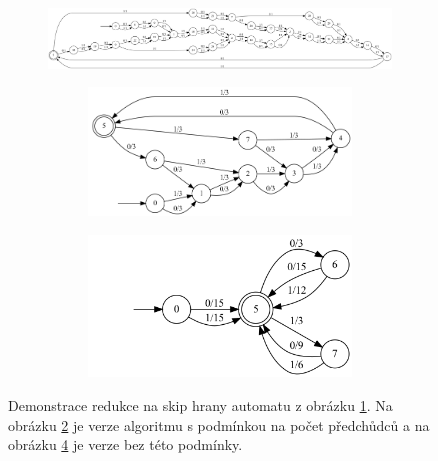 \begin{figure}[h]
    \centering
    \begin{subfigure}{.99\textwidth}
        \centering
        \includegraphics[scale=0.19]{obrazky-figures/reduce_img1.png}
        \caption{}
        \label{reduce_img1}
    \end{subfigure}
    \vfil
    \begin{subfigure}{.99\textwidth}
        \centering 
        \begin{subfigure}{.6\textwidth}
            \centering
            \includegraphics[scale=0.22]{obrazky-figures/reduce_img2.png}
            \caption{}
            \label{reduce_img2}
        \end{subfigure}
        \hfil
        \begin{subfigure}{.35\textwidth}
            \centering
            \includegraphics[scale=0.28]{obrazky-figures/reduce_img3.png}
            \caption{}
            \label{reduce_img3}
        \end{subfigure}
    \end{subfigure} 
    \caption{Demonstrace redukce na skip hrany automatu z obrázku \ref{reduce_img1}. Na obrázku \ref{reduce_img2} je verze algoritmu s podmínkou na počet předchůdců a na obrázku \ref{reduce_img3} je verze bez této podmínky.}
    \label{reduce_img}
\end{figure}

